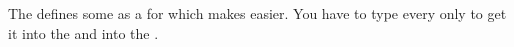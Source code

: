 \documentclass{article}
\begin{document}
The   defines some 
as a  for
which makes  easier. You have to type every
 only  to get it into the 
and into the .





\printindex
\end{document}
